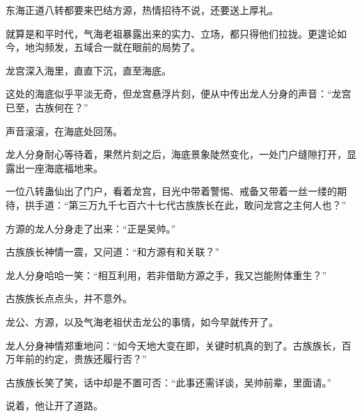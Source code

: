 \begin{this_body}
东海正道八转都要来巴结方源，热情招待不说，还要送上厚礼。

就算是和平时代，气海老祖暴露出来的实力、立场，都只得他们拉拢。更遑论如今，地沟频发，五域合一就在眼前的局势了。

龙宫深入海里，直直下沉，直至海底。

这处的海底似乎平淡无奇，但龙宫悬浮片刻，便从中传出龙人分身的声音：“龙宫已至，古族何在？”

声音滚滚，在海底处回荡。

龙人分身耐心等待着，果然片刻之后，海底景象陡然变化，一处门户缝隙打开，显露出一座海底福地来。

一位八转蛊仙出了门户，看着龙宫，目光中带着警惕、戒备又带着一丝一缕的期待，拱手道：“第三万九千七百六十七代古族族长在此，敢问龙宫之主何人也？”

方源的龙人分身走了出来：“正是吴帅。”

古族族长神情一震，又问道：“和方源有和关联？”

龙人分身哈哈一笑：“相互利用，若非借助方源之手，我又岂能附体重生？”

古族族长点点头，并不意外。

龙公、方源，以及气海老祖伏击龙公的事情，如今早就传开了。

龙人分身神情郑重地问：“如今天地大变在即，关键时机真的到了。古族族长，百万年前的约定，贵族还履行否？”

古族族长笑了笑，话中却是不置可否：“此事还需详谈，吴帅前辈，里面请。”

说着，他让开了道路。

\end{this_body}

